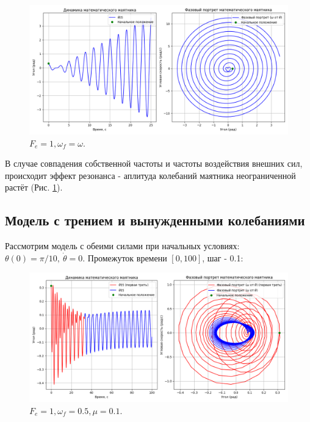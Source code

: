 \begin{figure}[h]  %
	\centering
	\includegraphics[width=1\textwidth]{imgs/f1ww.png}  %
	\caption{$F_e = 1, \omega_f = \omega$.}  %
	\label{fig:f1_ww}  %
\end{figure}

В случае совпадения собственной частоты и частоты воздействия внешних сил, происходит эффект резонанса - аплитуда колебаний маятника неограниченной растёт (Рис. \ref{fig:f1_ww}).
\newpage
\subsection*{Модель с трением и вынужденными колебаниями}
Рассмотрим модель с обеими силами при начальных условиях: $\theta(0) = \pi /10, \ \dot{\theta} = 0$. Промежуток времени $[0,100]$, шаг - 0.1:
\begin{figure}[h]  %
	\centering
	\includegraphics[width=1\textwidth]{imgs/f1w05mu01.png}  %
	\caption{$F_e = 1, \omega_f = 0.5, \mu = 0.1$.}  %
	\label{fig:f1_w05_mu01}  %
\end{figure}

